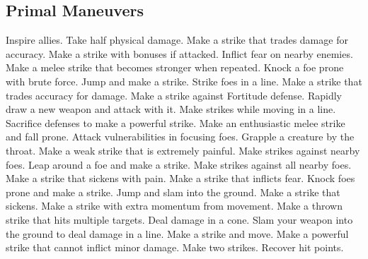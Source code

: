 \small
\subsection{Primal Maneuvers}\label{Primal Maneuvers}
\begin{spelllist}
 Inspire allies.
 Take half physical damage.
 Make a strike that trades damage for accuracy.
 Make a strike with bonuses if attacked.
 Inflict fear on nearby enemies.
 Make a melee strike that becomes stronger when repeated.
 Knock a foe prone with brute force.
 Jump and make a strike.
 Strike foes in a line.
 Make a strike that trades accuracy for damage.
 Make a strike against Fortitude defense.
 Rapidly draw a new weapon and attack with it.
 Make strikes while moving in a line.
 Sacrifice defenses to make a powerful strike.
 Make an enthusiastic melee strike and fall prone.
 Attack vulnerabilities in focusing foes.
 Grapple a creature by the throat.
 Make a weak strike that is extremely painful.
 Make strikes against nearby foes.
 Leap around a foe and make a strike.
 Make strikes against all nearby foes.
 Make a strike that sickens with pain.
 Make a strike that inflicts fear.
 Knock foes prone and make a strike.
 Jump and slam into the ground.
 Make a strike that sickens.
 Make a strike with extra momentum from movement.
 Make a thrown strike that hits multiple targets.
 Deal damage in a cone.
 Slam your weapon into the ground to deal damage in a line.
 Make a strike and move.
 Make a powerful strike that cannot inflict minor damage.
 Make two strikes.
 Recover hit points.
\end{spelllist}



